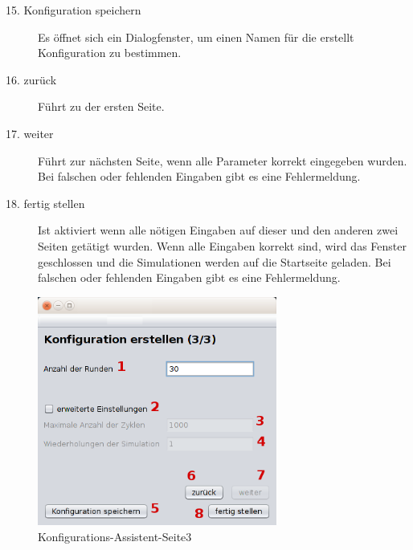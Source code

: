 \begin{description}
\item[15. Konfiguration speichern] Es öffnet sich ein Dialogfenster, um einen Namen für die erstellt Konfiguration zu bestimmen.

\item[16. zurück] Führt zu der ersten Seite.

\item[17. weiter] Führt zur nächsten Seite, wenn alle Parameter korrekt eingegeben wurden. Bei falschen oder fehlenden Eingaben gibt es eine Fehlermeldung.

\item[18. fertig stellen] Ist aktiviert wenn alle nötigen Eingaben auf dieser und den anderen zwei Seiten getätigt wurden. Wenn alle Eingaben korrekt sind, wird das Fenster geschlossen und die Simulationen werden auf die Startseite geladen. Bei falschen oder fehlenden Eingaben gibt es eine Fehlermeldung.

\end{description}

\pagebreak

\begin{figure}[hp] 
  \centering
     \includegraphics[width=0.7\textwidth]{GUI_Entwurf/WizardFenster3.png}
  \caption{Konfigurations-Assistent-Seite3}
  \label{fig:Bild4}
\end{figure}

